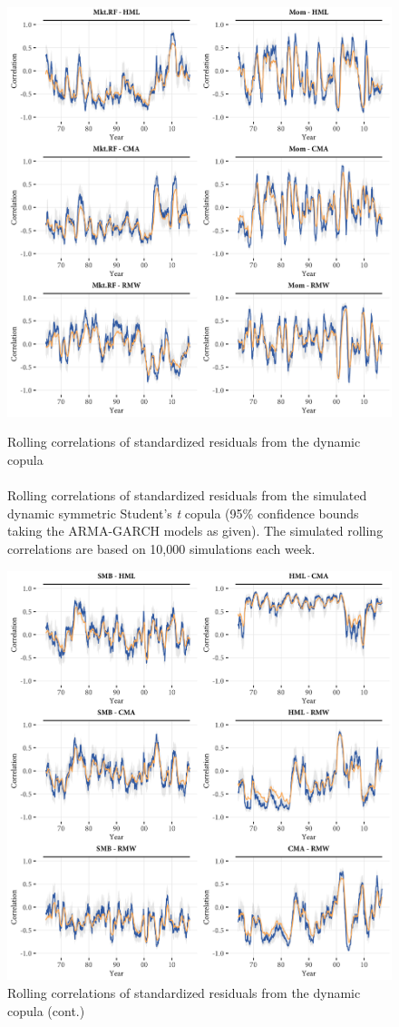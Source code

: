 \begin{figure}[!ht]
  \centering
  \caption{Rolling correlations of standardized residuals from the dynamic copula \\ \quad \\ Rolling correlations of standardized residuals from the simulated dynamic symmetric Student's \textit{t} copula (95\% confidence bounds taking the ARMA-GARCH models as given). The simulated rolling correlations are based on 10,000 simulations each week.}
  \includegraphics[width=\textwidth]{graphics/rolling_simulated1.png}
  \label{fig:rolling_simulated}
\end{figure}
\begin{figure}[!ht]
  \ContinuedFloat
  \centering
  \caption{Rolling correlations of standardized residuals from the dynamic copula (cont.)}
  \includegraphics[width=\textwidth]{graphics/rolling_simulated2.png}
\end{figure}
